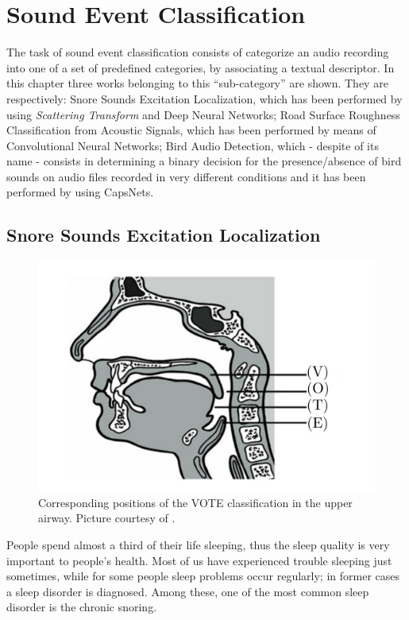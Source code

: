 \chapter{Sound Event Classification}
\label{ch:SEC}

The task of sound event classification consists of categorize an audio recording into one of a set of predefined categories, by associating a textual descriptor. In this chapter three works belonging to this ``sub-category'' are shown. They are respectively: Snore Sounds Excitation Localization, which has been performed by using \textit{Scattering Transform} and Deep Neural Networks; Road Surface Roughness Classification from Acoustic Signals, which has been performed by means of Convolutional Neural Networks; Bird Audio Detection, which - despite of its name - consists in determining a binary decision for the presence/absence of bird sounds on audio files recorded in very different conditions and it has been performed by using CapsNets.

\section{Snore Sounds Excitation Localization}
\label{sec:snoring_classification}
\begin{figure}[h]
	\centering
	\includegraphics[width=0.6\linewidth]{img/vote.pdf}
	\caption[VOTE Locations]{Corresponding positions of the VOTE classification in the upper airway. Picture courtesy of \cite{janott2014akustical}.} 
	\label{fig:vote}
\end{figure}

People spend almost a third of their life sleeping, thus the sleep quality is very important to people's health. Most of us  have experienced trouble sleeping just sometimes, while for some people sleep problems occur regularly; in former cases a sleep disorder is diagnosed. Among these, one of the most common sleep disorder \cite{sleep-disorders} is the chronic snoring.
 
